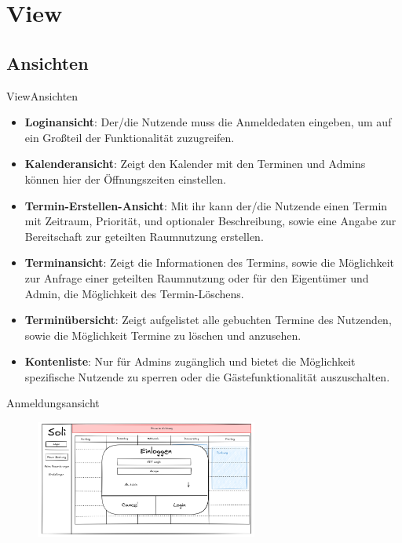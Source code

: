 \documentclass{sdqbeamer}
\begin{document}
\section{View}

\subsection{Ansichten}

\begin{frame}{View}{Ansichten}
    \begin{itemize}
        \item \textbf{Loginansicht}: Der/die Nutzende muss die Anmeldedaten eingeben, um auf ein Großteil der Funktionalität zuzugreifen.
        \item \textbf{Kalenderansicht}: Zeigt den Kalender mit den Terminen und Admins können hier der Öffnungszeiten einstellen.
        \item \textbf{Termin-Erstellen-Ansicht}: Mit ihr kann der/die Nutzende einen Termin mit Zeitraum, Priorität, und optionaler Beschreibung, sowie eine Angabe zur Bereitschaft zur geteilten Raumnutzung erstellen.
        \item \textbf{Terminansicht}: Zeigt die Informationen des Termins, sowie die Möglichkeit zur Anfrage einer geteilten Raumnutzung oder für den Eigentümer und Admin, die Möglichkeit des Termin-Löschens.
        \item \textbf{Terminübersicht}: Zeigt aufgelistet alle gebuchten Termine des Nutzenden, sowie die Möglichkeit Termine zu löschen und anzusehen.
        \item \textbf{Kontenliste}: Nur für Admins zugänglich und bietet die Möglichkeit spezifische Nutzende zu sperren oder die Gästefunktionalität auszuschalten.
    \end{itemize}
\end{frame}

\begin{frame}{Anmeldungsansicht}
    \begin{figure}
        \centering
        \includegraphics[width=0.65\textwidth]{pictures/figures/ui/anmeldungsseite}
        \label{fig:login}
    \end{figure}
\end{frame}
\end{document}
